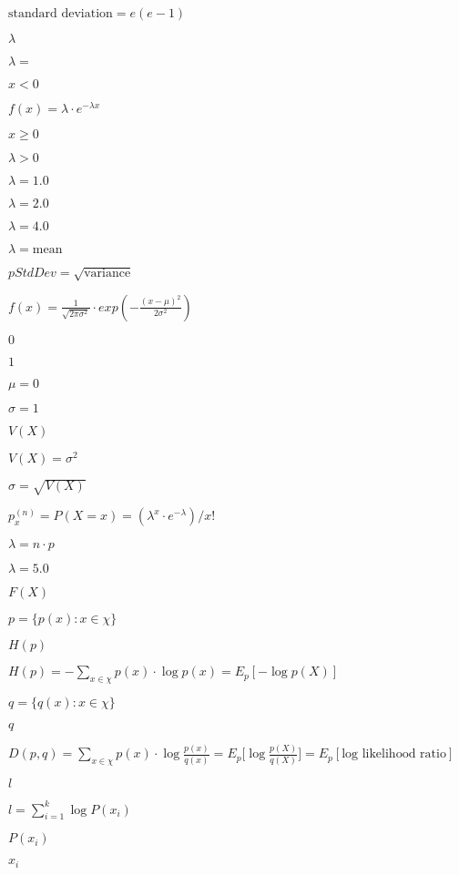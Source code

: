 \documentclass{article}
\begin{document}
$\mbox{standard deviation} = e(e-1)$
\pagebreak

$\lambda$
\pagebreak

$\lambda = $
\pagebreak

$x < 0$
\pagebreak

$ f(x) = \lambda \cdot e^{- \lambda x} $
\pagebreak

$x \geq 0$
\pagebreak

$\lambda > 0$
\pagebreak

$\lambda = 1.0$
\pagebreak

$\lambda = 2.0$
\pagebreak

$\lambda = 4.0$
\pagebreak

$\lambda = \mbox{mean}$
\pagebreak

$pStdDev = \sqrt{\mbox{variance}}$
\pagebreak

$ f(x) = \frac{1}{\sqrt{2 \pi \sigma^2}} \cdot exp \left(- \frac{(x- \mu)^2}{2 \sigma^2}\right) $
\pagebreak

$0$
\pagebreak

$1$
\pagebreak

$\mu = 0$
\pagebreak

$\sigma = 1$
\pagebreak

$V(X)$
\pagebreak

$ V(X) = \sigma^2 $
\pagebreak

$\sigma = \sqrt{V(X)}$
\pagebreak

$ p_x^{(n)} = P(X = x) = ( \lambda^x \cdot e^{- \lambda} ) / x! $
\pagebreak

$\lambda = n \cdot p$
\pagebreak

$\lambda = 5.0$
\pagebreak

$F(X)$
\pagebreak

$p = \{p(x): x \in \chi\}$
\pagebreak

$H(p)$
\pagebreak

$ H(p) = - \sum_{x \in \chi} p(x) \cdot \log {p(x)} = E_p [- \log {p(X)}] $
\pagebreak

$q = \{q(x): x \in \chi\}$
\pagebreak

$q$
\pagebreak

$ D(p,q) = \sum_{x \in \chi} p(x) \cdot \log {\frac{p(x)}{q(x)}} = E_p \big[ \log {\frac{p(X)}{q(X)}}\big] = E_p [ \mbox{log likelihood ratio} ] $
\pagebreak

$l$
\pagebreak

$ l = \sum_{i=1}^k \log {P( x_i )} $
\pagebreak

$P( x_i )$
\pagebreak

$x_i$
\pagebreak
\end{document}
